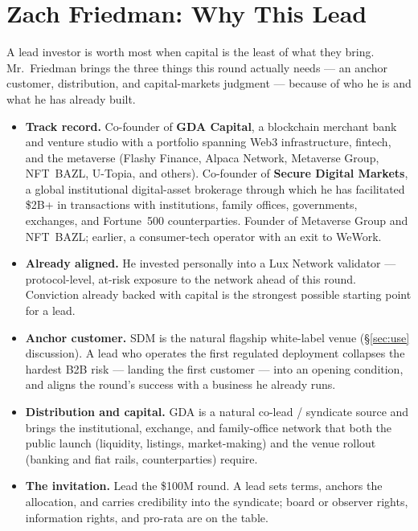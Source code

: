 \documentclass[11pt,a4paper]{article}
\begin{document}
\section{Zach Friedman: Why This Lead}

A lead investor is worth most when capital is the least of what they bring.
Mr.\ Friedman brings the three things this round actually needs --- an
anchor customer, distribution, and capital-markets judgment --- because of
who he is and what he has already built.

\begin{itemize}[leftmargin=1.4em]
  \item \textbf{Track record.} Co-founder of \textbf{GDA Capital}, a
  blockchain merchant bank and venture studio with a portfolio spanning
  Web3 infrastructure, fintech, and the metaverse (Flashy Finance, Alpaca
  Network, Metaverse Group, NFT~BAZL, U-Topia, and others). Co-founder of
  \textbf{Secure Digital Markets}, a global institutional digital-asset
  brokerage through which he has facilitated \$2B+ in transactions with
  institutions, family offices, governments, exchanges, and Fortune~500
  counterparties. Founder of Metaverse Group and NFT~BAZL; earlier, a
  consumer-tech operator with an exit to WeWork.
  \item \textbf{Already aligned.} He invested personally into a Lux Network
  validator --- protocol-level, at-risk exposure to the network ahead of
  this round. Conviction already backed with capital is the strongest
  possible starting point for a lead.
  \item \textbf{Anchor customer.} SDM is the natural flagship white-label
  venue (\S\ref{sec:use} discussion). A lead who operates the first
  regulated deployment collapses the hardest B2B risk --- landing the first
  customer --- into an opening condition, and aligns the round's success
  with a business he already runs.
  \item \textbf{Distribution and capital.} GDA is a natural co-lead /
  syndicate source and brings the institutional, exchange, and family-office
  network that both the public launch (liquidity, listings, market-making)
  and the venue rollout (banking and fiat rails, counterparties) require.
  \item \textbf{The invitation.} Lead the \$100M round. A lead sets terms,
  anchors the allocation, and carries credibility into the syndicate; board
  or observer rights, information rights, and pro-rata are on the table.
\end{itemize}
\end{document}
